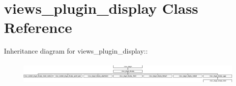 \hypertarget{classviews__plugin__display}{
\section{views\_\-plugin\_\-display Class Reference}
\label{classviews__plugin__display}
}
Inheritance diagram for views\_\-plugin\_\-display::\begin{figure}[H]
\begin{center}
\leavevmode
\includegraphics[height=1.16364cm]{classviews__plugin__display}
\end{center}
\end{figure}
